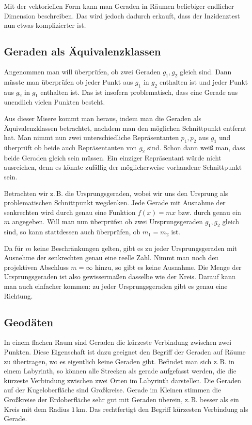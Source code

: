 \documentclass[a4paper,10pt,fleqn,twocolumn,twoside,dvipdfmx]{scrartcl}
\begin{document}
Mit der vektoriellen Form kann man Geraden in Räumen beliebiger
endlicher Dimension beschreiben. Das wird jedoch dadurch erkauft,
dass der Inzidenztest nun etwas komplizierter ist.

\subsection{Geraden als Äquivalenzklassen}

Angenommen man will überprüfen, ob zwei Geraden $g_1,g_2$ gleich sind.
Dann müsste man überprüfen ob jeder Punkt aus $g_1$ in $g_2$
enthalten ist und jeder Punkt aus $g_2$ in $g_1$ enthalten ist.
Das ist insofern problematisch, dass eine Gerade aus unendlich vielen
Punkten besteht.

Aus dieser Misere kommt man heraus, indem man die Geraden als
Äquivalenzklassen betrachtet, nachdem man den möglichen Schnittpunkt
entfernt hat. Man nimmt nun zwei unterschiedliche Repräsentanten
$p_1,p_2$ aus $g_1$ und überprüft ob beide auch Repräsentanten
von $g_2$ sind. Schon dann weiß man, dass beide Geraden gleich
sein müssen. Ein einziger Repräsentant würde nicht ausreichen, denn
es könnte zufällig der möglicherweise vorhandene Schnittpunkt sein.

Betrachten wir z.\,B. die Ursprungsgeraden, wobei wir uns den
Ursprung als problematischen Schnittpunkt wegdenken. Jede Gerade
mit Ausnahme der senkrechten wird durch genau eine Funktion
$f(x)=mx$ bzw. durch genau ein $m$ angegeben.
Will man nun überprüfen ob zwei Ursprungsgeraden $g_1,g_2$ gleich
sind, so kann stattdessen auch überprüfen, ob $m_1=m_2$ ist.

Da für $m$ keine Beschränkungen gelten, gibt es zu jeder
Ursprungsgeraden mit Ausnehme der senkrechten genau eine reelle Zahl.
Nimmt man noch den projektiven Abschluss $m=\infty$ hinzu, so
gibt es keine Ausnahme. Die Menge der Ursprungsgeraden ist also
gewissermaßen dasselbe wie der Kreis. Darauf kann man auch einfacher
kommen: zu jeder Ursprungsgeraden gibt es genau eine Richtung.


\subsection{Geodäten}

In einem flachen Raum sind Geraden die kürzeste Verbindung zwischen
zwei Punkten. Diese Eigenschaft ist dazu geeignet den Begriff der
Geraden auf Räume zu übertragen, wo es eigentlich keine Geraden
gibt. Befindet man sich z.\,B. in einem Labyrinth, so können alle
Strecken als gerade aufgefasst werden, die die kürzeste Verbindung
zwischen zwei Orten im Labyrinth darstellen. Die Geraden auf der
Kugeloberfläche sind Großkreise. Gerade im Kleinen stimmen die
Großkreise der Erdoberfläche sehr gut mit Geraden überein,
z.\,B. besser als ein Kreis mit dem Radius $1\,\mathrm{km}$.
Das rechtfertigt den Begriff kürzesten Verbindung als Gerade.
\end{document}
